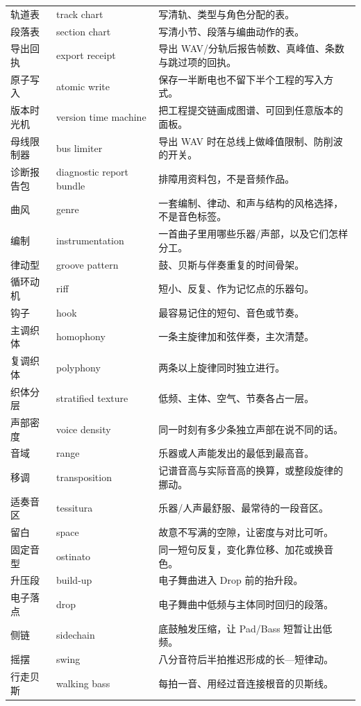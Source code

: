 \begin{longtable}{p{}p{}p{}}
轨道表 & track chart & 写清轨、类型与角色分配的表。 \\
段落表 & section chart & 写清小节、段落与编曲动作的表。 \\
导出回执 & export receipt & 导出 WAV/分轨后报告帧数、真峰值、条数与跳过项的回执。 \\
原子写入 & atomic write & 保存一半断电也不留下半个工程的写入方式。 \\
版本时光机 & version time machine & 把工程提交链画成图谱、可回到任意版本的面板。 \\
母线限制器 & bus limiter & 导出 WAV 时在总线上做峰值限制、防削波的开关。 \\
诊断报告包 & diagnostic report bundle & 排障用资料包，不是音频作品。 \\
曲风 & genre & 一套编制、律动、和声与结构的风格选择，不是音色标签。 \\
编制 & instrumentation & 一首曲子里用哪些乐器/声部，以及它们怎样分工。 \\
律动型 & groove pattern & 鼓、贝斯与伴奏重复的时间骨架。 \\
循环动机 & riff & 短小、反复、作为记忆点的乐器句。 \\
钩子 & hook & 最容易记住的短句、音色或节奏。 \\
主调织体 & homophony & 一条主旋律加和弦伴奏，主次清楚。 \\
复调织体 & polyphony & 两条以上旋律同时独立进行。 \\
织体分层 & stratified texture & 低频、主体、空气、节奏各占一层。 \\
声部密度 & voice density & 同一时刻有多少条独立声部在说不同的话。 \\
音域 & range & 乐器或人声能发出的最低到最高音。 \\
移调 & transposition & 记谱音高与实际音高的换算，或整段旋律的挪动。 \\
适奏音区 & tessitura & 乐器/人声最舒服、最常待的一段音区。 \\
留白 & space & 故意不写满的空隙，让密度与对比可听。 \\
固定音型 & ostinato & 同一短句反复，变化靠位移、加花或换音色。 \\
升压段 & build-up & 电子舞曲进入 Drop 前的抬升段。 \\
电子落点 & drop & 电子舞曲中低频与主体同时回归的段落。 \\
侧链 & sidechain & 底鼓触发压缩，让 Pad/Bass 短暂让出低频。 \\
摇摆 & swing & 八分音符后半拍推迟形成的长—短律动。 \\
行走贝斯 & walking bass & 每拍一音、用经过音连接根音的贝斯线。 \\

\end{longtable}
